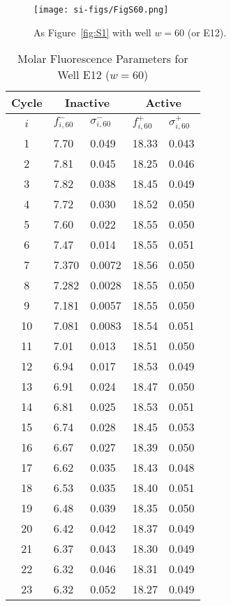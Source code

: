                 \begin{figure}
                    \centering
                    \texttt{[image: si-figs/FigS60.png]}
                    \caption{
                        As Figure~\ref{fig:S1} with well $w=60$ (or E12).
                    }
                \end{figure}
                \clearpage
    \begin{table}
        \caption{Molar Fluorescence Parameters for Well E12 ($w=60$)}
        \centering
        \begin{tabular}{c|ll|ll}
            Cycle & \multicolumn{2}{c|}{Inactive} & \multicolumn{2}{c}{Active} \\
            \hline
            $i$ & $f_{i,60}^{-}$ & $\sigma_{i,60}^{-}$ &  $f_{i,60}^{+}$ & $\sigma_{i,60}^{+}$ \\
            \hline
    1 & 7.70 & 0.049 & 18.33 & 0.043 \\
2 & 7.81 & 0.045 & 18.25 & 0.046 \\
3 & 7.82 & 0.038 & 18.45 & 0.049 \\
4 & 7.72 & 0.030 & 18.52 & 0.050 \\
5 & 7.60 & 0.022 & 18.55 & 0.050 \\
6 & 7.47 & 0.014 & 18.55 & 0.051 \\
7 & 7.370 & 0.0072 & 18.56 & 0.050 \\
8 & 7.282 & 0.0028 & 18.55 & 0.050 \\
9 & 7.181 & 0.0057 & 18.55 & 0.050 \\
10 & 7.081 & 0.0083 & 18.54 & 0.051 \\
11 & 7.01 & 0.013 & 18.51 & 0.050 \\
12 & 6.94 & 0.017 & 18.53 & 0.049 \\
13 & 6.91 & 0.024 & 18.47 & 0.050 \\
14 & 6.81 & 0.025 & 18.53 & 0.051 \\
15 & 6.74 & 0.028 & 18.45 & 0.053 \\
16 & 6.67 & 0.027 & 18.39 & 0.050 \\
17 & 6.62 & 0.035 & 18.43 & 0.048 \\
18 & 6.53 & 0.035 & 18.40 & 0.051 \\
19 & 6.48 & 0.039 & 18.35 & 0.050 \\
20 & 6.42 & 0.042 & 18.37 & 0.049 \\
21 & 6.37 & 0.043 & 18.30 & 0.049 \\
22 & 6.32 & 0.046 & 18.31 & 0.049 \\
23 & 6.32 & 0.052 & 18.27 & 0.049 \\

\end{tabular}
\end{table}

